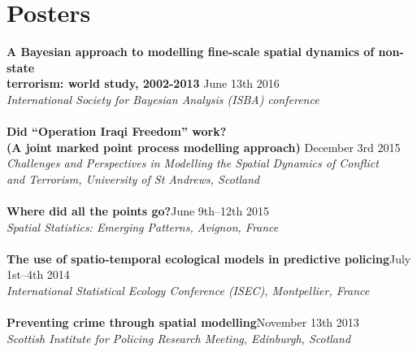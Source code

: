 \documentclass[10pt,letter]{article}
\begin{document}
\section*{Posters}
\vspace{1mm}

{\textbf {A Bayesian approach to modelling fine-scale spatial dynamics of non-state\\
 terrorism: world study, 2002-2013 }}\hfill June 13th 2016\\
 {\sl International Society for Bayesian Analysis (ISBA) conference}\\
 \hdashrule[0.5ex]{4cm}{1pt}{1pt}\\
 {\textbf{Did ``Operation Iraqi Freedom'' work? \\
(A joint marked point process modelling approach) }}\hfill December 3rd 2015\\
 {\sl Challenges and Perspectives in Modelling the Spatial Dynamics of Conflict\\ and Terrorism, University of St Andrews, Scotland}\\
 \hdashrule[0.5ex]{4cm}{1pt}{1pt}\\
{\textbf{Where did all the points go?}}\hfill June 9th--12th 2015\\
 {\sl Spatial Statistics: Emerging Patterns, Avignon, France}\\
\hdashrule[0.5ex]{4cm}{1pt}{1pt}\\
 {\textbf{The use of spatio-temporal ecological models in predictive policing}}\hfill July 1st--4th 2014\\
 {\sl International Statistical Ecology Conference (ISEC), Montpellier, France}\\
 \hdashrule[0.5ex]{4cm}{1pt}{1pt}\\
{\textbf{Preventing crime through spatial modelling}}\hfill November 13th 2013\\
 {\sl Scottish Institute for Policing Research Meeting, Edinburgh, Scotland}\\

  
\end{document}
